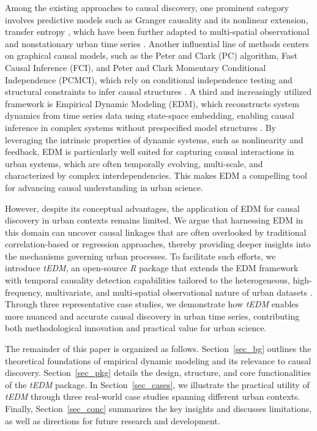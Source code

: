\documentclass[authoryear,preprint,review,12pt]{elsarticle}
\begin{document}
Among the existing approaches to causal discovery, one prominent category involves predictive models such as Granger causality \citep{granger1969grangertest,geweke1982grangertest2} and its nonlinear extension, transfer entropy \citep{schreiber2000te1,vicente2010te2}, which have been further adapted to multi-spatial observational and nonstationary urban time series \citep{deng2022urban_granger_causality,gan2025urban_transfer_entropy}. Another influential line of methods centers on graphical causal models, such as the Peter and Clark (PC) algorithm, Fast Causal Inference (FCI), and Peter and Clark Momentary Conditional Independence (PCMCI), which rely on conditional independence testing and structural constraints to infer causal structures \citep{spirtes1993pc,runge2019pcmci,runge2023cits}. A third and increasingly utilized framework is Empirical Dynamic Modeling (EDM), which reconstructs system dynamics from time series data using state-space embedding, enabling causal inference in complex systems without prespecified model structures \citep{lorenz1969ssr,Takens1981embedding,Mane1981embedding,sugihara2012ccm}. By leveraging the intrinsic properties of dynamic systems, such as nonlinearity and feedback, EDM is particularly well suited for capturing causal interactions in urban systems, which are often temporally evolving, multi-scale, and characterized by complex interdependencies. This makes EDM a compelling tool for advancing causal understanding in urban science.

However, despite its conceptual advantages, the application of EDM for causal discovery in urban contexts remains limited. We argue that harnessing EDM in this domain can uncover causal linkages that are often overlooked by traditional correlation-based or regression approaches, thereby providing deeper insights into the mechanisms governing urban processes. To facilitate such efforts, we introduce \textit{tEDM}, an open-source \textit{R} package that extends the EDM framework with temporal causality detection capabilities tailored to the heterogeneous, high-frequency, multivariate, and multi-spatial observational nature of urban datasets \citep{deng2022urban_granger_causality,gan2025urban_transfer_entropy,fekete2025urban_transport}. Through three representative case studies, we demonstrate how \textit{tEDM} enables more nuanced and accurate causal discovery in urban time series, contributing both methodological innovation and practical value for urban science.

The remainder of this paper is organized as follows. Section~\ref{sec_bg} outlines the theoretical foundations of empirical dynamic modeling and its relevance to causal discovery. Section~\ref{sec_pkg} details the design, structure, and core functionalities of the \textit{tEDM} package. In Section~\ref{sec_cases}, we illustrate the practical utility of \textit{tEDM} through three real-world case studies spanning different urban contexts. Finally, Section~\ref{sec_conc} summarizes the key insights and discusses limitations, as well as directions for future research and development.
\end{document}
